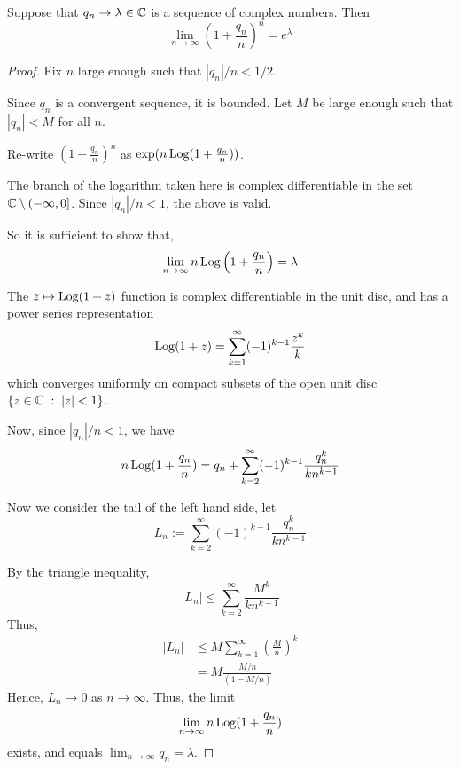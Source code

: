 \documentclass{unswmaths}
\begin{document}
\begin{lemma}
\label{stuart}
    Suppose that $q_n \rightarrow \lambda \in \mathbb{C}$ is a sequence of complex
    numbers. Then
    \begin{equation*}
        \lim_{n\rightarrow\infty} \left(1+\frac{q_n}{n}\right)^n = e^{\lambda}
    \end{equation*} 
\end{lemma}
\begin{proof}
    Fix $n$ large enough such that $|q_n|/n < 1/2$.
    
    Since $q_n$ is a convergent sequence, it is bounded. Let $M$
    be large enough such that $|q_n| < M$ for all $n$.
    
    Re-write $\left(1+\frac{q_n}{n}\right)^n$ as $\exp(n\operatorname{Log}(1+\frac{q_n}{n}))$.
    
    The branch of the logarithm taken here is complex differentiable
    in the set $\mathbb{C}\setminus(-\infty,0]$. Since $|q_n|/n < 1$, the above is valid.
    
    So it is sufficient to show that,
    \begin{equation*}
        \lim_{n\rightarrow\infty} n\operatorname{Log}\left(1+\frac{q_n}{n}\right) = \lambda
    \end{equation*}
    
    The $z\mapsto \operatorname{Log}(1+z)$ function is complex differentiable in the unit disc,
    and has a power series representation 
    \begin{equation*}
        \operatorname{Log}(1+z) = \sum_{k=1}^\infty (-1)^{k-1}\frac{z^k}{k}
    \end{equation*}
    which converges uniformly on compact subsets of the open unit disc $\{z\in \mathbb{C}\;:\;|z| < 1\}$.
    
    Now, since $|q_n|/n < 1$, we have
    \begin{equation*}
        n\operatorname{Log}(1+\frac{q_n}{n}) = q_n+\sum_{k=2}^\infty (-1)^{k-1}\frac{q_n^k}{kn^{k-1}}
    \end{equation*}
    
    Now we consider the tail of the left hand side, let
    \begin{equation*}
        L_n := \sum_{k=2}^\infty (-1)^{k-1} \frac{q_n^k}{kn^{k-1}}
    \end{equation*}
    
    By the triangle inequality,
    \begin{equation*}
        |L_n| \leq \sum_{k=2}^\infty \frac{M^k}{kn^{k-1}}
    \end{equation*}
    Thus,
    \begin{align*}
        |L_n| &\leq M\sum_{k=1}^\infty \left(\frac{M}{n}\right)^k\\
        &= M\frac{M/n}{(1-M/n)}
    \end{align*}
    Hence, $L_n\rightarrow 0$ as $n\rightarrow\infty$.
    Thus, the limit
    \begin{equation*}
        \lim_{n\rightarrow\infty} n\operatorname{Log}(1+\frac{q_n}{n})
    \end{equation*}
    exists, and equals $\lim_{n\rightarrow\infty}q_n = \lambda$.
    

\end{proof}
\end{document}
